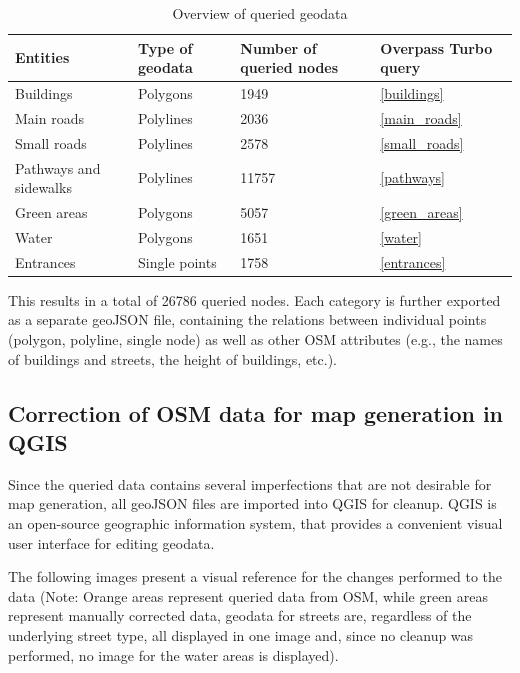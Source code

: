 \begin{table}[!ht]
	\small
	\centering
	\begin{tabular}{|l|l|l|l|}
		\hline
		\textbf{Entities}       & \textbf{Type of geodata}       & \textbf{Number of queried nodes}       & \textbf{Overpass Turbo query} \\
		\hline
        Buildings               & Polygons              & 1949                          & \ref{buildings} \\
		\hline
		Main roads              & Polylines             & 2036                          & \ref{main_roads} \\
		\hline
		Small roads             & Polylines             & 2578                          & \ref{small_roads} \\
		\hline
		Pathways and sidewalks  & Polylines             & 11757                         & \ref{pathways} \\
		\hline
        Green areas             & Polygons              & 5057                          & \ref{green_areas} \\
		\hline
        Water                   & Polygons              & 1651                          & \ref{water} \\
		\hline
        Entrances               & Single points         & 1758                          & \ref{entrances} \\
		\hline
	\end{tabular}
	\caption{Overview of queried geodata}
\end{table}

This results in a total of 26786 queried nodes. Each category is further exported as a separate geoJSON file, containing the relations between individual points (polygon, polyline, single node) as well as other OSM attributes (e.g., the names of buildings and streets, the height of buildings, etc.).

\subsection{Correction of OSM data for map generation in QGIS}
Since the queried data contains several imperfections that are not desirable for map generation, all geoJSON files are imported into QGIS for cleanup. QGIS is an open-source geographic information system, that provides a convenient visual user interface for editing geodata.

The following images present a visual reference for the changes performed to the data (Note: Orange areas represent queried data from OSM, while green areas represent manually corrected data, geodata for streets are, regardless of the underlying street type, all displayed in one image and, since no cleanup was performed, no image for the water areas is displayed).

